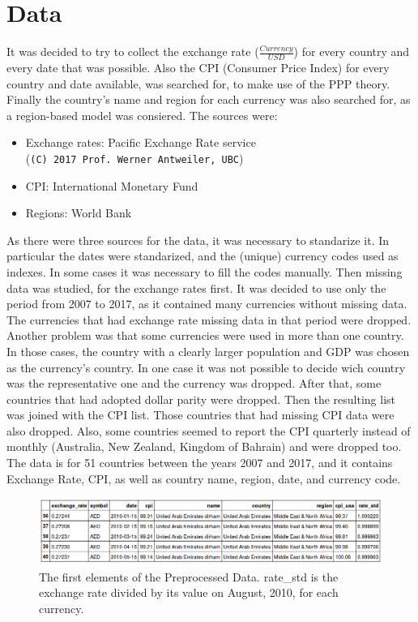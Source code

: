 \documentclass[a4paper,12pt]{article}
\begin{document}
\section{Data}
It was decided to try to collect the exchange rate ($\frac{Currency}{USD}$) for every country and every date that was possible. Also the CPI (Consumer Price Index) for every country and date available, was searched for, to make use of the PPP theory. Finally the country's name and region for each currency was also searched for, as a region-based model was consiered. The sources were:
\begin{itemize}
\item Exchange rates: Pacific Exchange Rate service \\(\verb+(C) 2017 Prof. Werner Antweiler, UBC+)
\item CPI: International Monetary Fund
\item Regions: World Bank
\end{itemize}
As there were three sources for the data, it was necessary to standarize it. In particular the dates were standarized, and the (unique) currency codes used as indexes. In some cases it was necessary to fill the codes manually. Then missing data was studied, for the exchange rates first. It was decided to use only the period from 2007 to 2017, as it contained many currencies without missing data. The currencies that had exchange rate missing data in that period were dropped. Another problem was that some currencies were used in more than one country. In those cases, the country with a clearly larger population and GDP was chosen as the currency's country. In one case it was not possible to decide wich country was the representative one and the currency was dropped. After that, some countries that had adopted dollar parity were dropped. Then the resulting list was joined with the CPI list. Those countries that had missing CPI data were also dropped. Also, some countries seemed to report the CPI quarterly instead of monthly (Australia, New Zealand, Kingdom of Bahrain) and were dropped too. 
\\The data is for 51 countries between the years 2007 and 2017, and it contains Exchange Rate, CPI, as well as country name, region, date, and currency code.

\begin{figure}[!h]
\centering
\includegraphics[width=4.5in]{images/i002_prep_data.png}
\caption{The first elements of the Preprocessed Data. rate\_std is the exchange rate divided by its value on August, 2010, for each currency.}
\label{fig_raw_data}
\end{figure}
\end{document}

